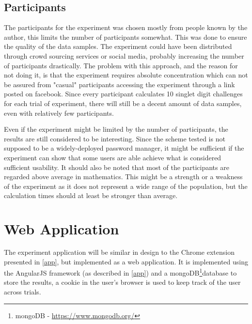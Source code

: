 \subsection{Participants}
The participants for the experiment was chosen mostly from people known by the author, this limits the number of participants somewhat. This was done to ensure the quality of the data samples. The experiment could have been distributed through crowd sourcing services or social media, probably increasing the number of participants drastically. The problem with this approach, and the reason for not doing it, is that the experiment requires absolute concentration which can not be assured from "casual" participants accessing the experiment through a link posted on facebook. Since every participant calculates 10 singlet digit challenges for each trial of experiment, there will still be a decent amount of data samples, even with relatively few participants. 
\par Even if the experiment might be limited by the number of participants, the results are still considered to be interesting. Since the scheme tested is not supposed to be a widely-deployed password manager, it might be sufficient if the experiment can show that some users are able achieve what is considered sufficient usability. It should also be noted that most of the participants are regarded above average in mathematics. This might be a strength or a weakness of the experiment as it does not represent a wide range of the population, but the calculation times should at least be stronger than average.


\section{Web Application}
The experiment application will be similar in design to the Chrome extension presented in \autoref{app}, but implemented as a web application. It is implemented using the AngularJS framework (as described in \autoref{app}) and a mongoDB\footnote{mongoDB - \url{https://www.mongodb.org/}}database to store the results, a cookie in the user's browser is used to keep track of the user across trials. 

